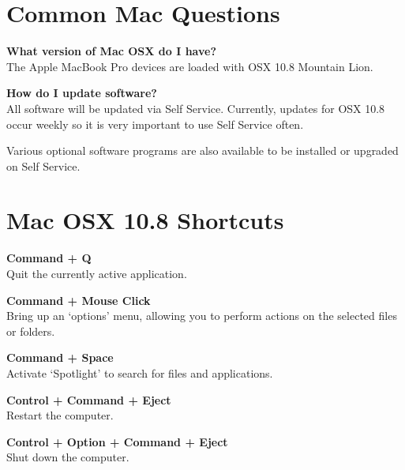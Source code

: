 \documentclass[10pt,foldmark,notumble]{leaflet}
\begin{document}
\section{Common Mac Questions\color{red}\hrulefill\color{black}}
\textbf{What version of Mac OSX do I have?}\\
The Apple MacBook Pro devices are loaded with OSX 10.8 Mountain Lion.

\textbf{How do I update software?}\\
All software will be updated via Self Service. Currently, updates for OSX 10.8 occur weekly so it is very important to use Self Service often.

Various optional software programs are also available to be installed or upgraded on Self Service.



\section{Mac OSX 10.8 Shortcuts\color{red}\hrulefill\color{black}}
\textbf{Command + Q}\\
Quit the currently active application. %

\textbf{Command + Mouse Click}\\
Bring up an `options' menu, allowing you to perform actions on the selected files or folders.

\textbf{Command + Space}\\
Activate `Spotlight' to search for files and applications.

\textbf{Control + Command + Eject}\\
Restart the computer.

\textbf{Control + Option + Command + Eject}\\
Shut down the computer.
\end{document}
